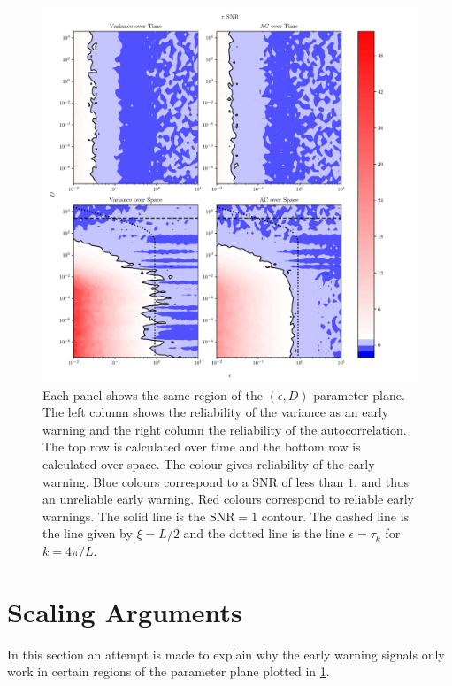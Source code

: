 \begin{figure}
  \centering
  \includegraphics[width=\textwidth,keepaspectratio]{parameter_plane}
  \caption[The quality of early warning signals in the $\epsilon$ and $D$ plane]{Each panel shows the same region of the $(\epsilon,D)$ parameter plane. The left column shows the
    reliability of the variance as an early warning and the right column the reliability of the autocorrelation. The top row is calculated over time and the bottom row is calculated over space.
    The colour gives reliability of the early warning. Blue colours correspond to a SNR of less than $1$, and thus an unreliable early warning. Red colours correspond to reliable early warnings.
    The solid line is the $\mathrm{SNR} = 1$ contour. The dashed line is the line given by $\xi = L/2$ and the dotted line  is the line $\epsilon = \tau_k$ for $k = 4\pi/L$.}
  \label{fig:parameter_plane}
\end{figure}


\section{Scaling Arguments}
\label{sec:scaling_arguments}
    
In this section an attempt is made to explain why the early warning signals only work in certain regions of the parameter plane plotted in \cref{fig:parameter_plane}.

